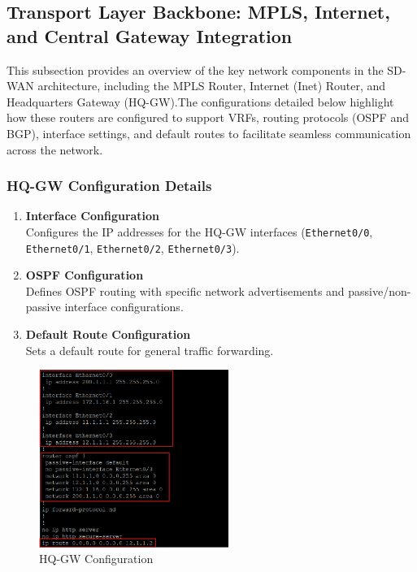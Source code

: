 \documentclass[12pt,english]{report}
\begin{document}
\subsection{Transport Layer Backbone: MPLS, Internet, and Central Gateway Integration}
This subsection provides an overview of the key network components in the SD-WAN architecture, including the MPLS Router, Internet (Inet) Router, and Headquarters Gateway (HQ-GW).The configurations detailed below highlight how these routers are configured to support VRFs, routing protocols (OSPF and BGP), interface settings, and default routes to facilitate seamless communication across the network.
\subsubsection{HQ-GW Configuration Details}
\begin{enumerate}
    \item \textbf{Interface Configuration} \\
    Configures the IP addresses for the HQ-GW interfaces (\texttt{Ethernet0/0}, \texttt{Ethernet0/1}, \texttt{Ethernet0/2}, \texttt{Ethernet0/3}).   
    \item \textbf{OSPF Configuration} \\
    Defines OSPF routing with specific network advertisements and passive/non-passive interface configurations.    
    \item \textbf{Default Route Configuration} \\
    Sets a default route for general traffic forwarding.
\end{enumerate}
\begin{figure}[H]
    \centering
    \includegraphics[width= 0.55\textwidth]{chapitre 3/1.png}
    \caption{HQ-GW Configuration}
    \label{fig: HQ-GW Configuration}
\end{figure}
\end{document}
